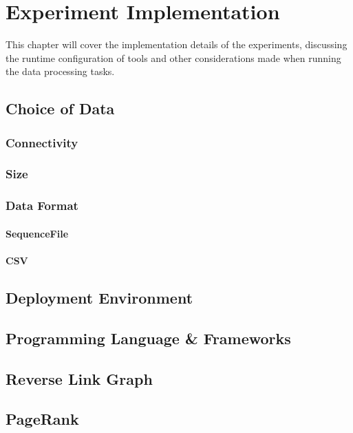 \chapter{Experiment Implementation}
This chapter will cover the implementation details of the experiments, discussing the runtime configuration of tools and other considerations made when running the data processing tasks.

\section{Choice of Data}

\subsection{Connectivity}

\subsection{Size}

\subsection{Data Format}

\subsubsection{SequenceFile}

\subsubsection{CSV}

\section{Deployment Environment}

\section{Programming Language \& Frameworks}

\section{Reverse Link Graph}

\section{PageRank}
